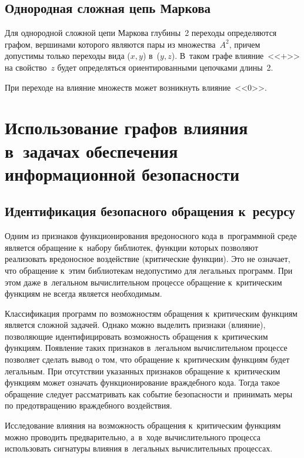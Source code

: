 \begin{multicols}{2}
  \subsection{Однородная сложная цепь Маркова}
  
  Для однородной сложной цепи Маркова глубины~2 переходы определяются 
графом, вершинами которого являются пары из множества~$A^2$, причем 
допустимы только переходы вида ($x, y$) в~($y, z$). В~таком графе 
влияние~<<$+$>> на свойство~$z$ будет определяться ориентированными 
цепочками длины~2. 
  
  При переходе на влияние множеств может возникнуть влияние~<<0>>. 

\section{Использование графов влияния в~задачах обеспечения 
информационной безопасности}

\vspace*{-1pt}
  
  \subsection{Идентификация безопасного обращения к~ресурсу}
  
  \vspace*{-1pt}
  
  Одним из признаков функционирования вредоносного кода в~программной 
среде является обращение к~набору библиотек, функции которых позволяют 
реализовать вредоносное воздействие (критические функции). Это не означает, 
что обращение к~этим библиотекам недопустимо для легальных программ. При 
этом даже в~легальном вычислительном процессе обращение к~критическим 
функциям не всегда является необходимым. 

Классификация программ по 
возможностям обращения к~критическим функциям является сложной задачей. 
  Однако можно выделить признаки (влияние), позволяющие 
идентифицировать возможность обращения к~критическим функциям. 
Появление таких признаков в~легальном вычислительном процессе позволяет 
сделать вывод о том, что обращение к~критическим функциям будет легальным. 
При отсутствии указанных признаков обращение к~критическим функциям 
может означать функционирование враждебного кода. Тогда такое обращение 
следует рассматривать как событие без\-опас\-ности и~принимать меры по 
предотвращению враждебного воздействия. 
  
  Исследование влияния на возможность обращения к~критическим функциям 
можно проводить предварительно, а~в~ходе вычислительного процесса 
использовать сигнатуры влияния в~легальных вычислительных процессах. 


\end{multicols}
